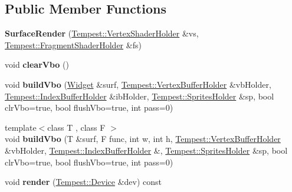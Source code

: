 \subsection*{Public Member Functions}
\begin{DoxyCompactItemize}
\item 
\hypertarget{class_tempest_1_1_surface_render_a8409eaaa4ee411aac49ae4cd9ac92573}{{\bfseries Surface\+Render} (\hyperlink{struct_tempest_1_1_vertex_shader_holder}{Tempest\+::\+Vertex\+Shader\+Holder} \&vs, \hyperlink{struct_tempest_1_1_fragment_shader_holder}{Tempest\+::\+Fragment\+Shader\+Holder} \&fs)}\label{class_tempest_1_1_surface_render_a8409eaaa4ee411aac49ae4cd9ac92573}

\item 
\hypertarget{class_tempest_1_1_surface_render_ae8529cbe1eae55aeda6684b8dc53145c}{void {\bfseries clear\+Vbo} ()}\label{class_tempest_1_1_surface_render_ae8529cbe1eae55aeda6684b8dc53145c}

\item 
\hypertarget{class_tempest_1_1_surface_render_ac4a3410c515efb6d6cb569a4bf5b7811}{void {\bfseries build\+Vbo} (\hyperlink{class_tempest_1_1_widget}{Widget} \&surf, \hyperlink{class_tempest_1_1_vertex_buffer_holder}{Tempest\+::\+Vertex\+Buffer\+Holder} \&vb\+Holder, \hyperlink{class_tempest_1_1_index_buffer_holder}{Tempest\+::\+Index\+Buffer\+Holder} \&ib\+Holder, \hyperlink{class_tempest_1_1_sprites_holder}{Tempest\+::\+Sprites\+Holder} \&sp, bool clr\+Vbo=true, bool flush\+Vbo=true, int pass=0)}\label{class_tempest_1_1_surface_render_ac4a3410c515efb6d6cb569a4bf5b7811}

\item 
\hypertarget{class_tempest_1_1_surface_render_ad46485e4217d02f5c46e112b7c929019}{{\footnotesize template$<$class T , class F $>$ }\\void {\bfseries build\+Vbo} (T \&surf, F func, int w, int h, \hyperlink{class_tempest_1_1_vertex_buffer_holder}{Tempest\+::\+Vertex\+Buffer\+Holder} \&vb\+Holder, \hyperlink{class_tempest_1_1_index_buffer_holder}{Tempest\+::\+Index\+Buffer\+Holder} \&, \hyperlink{class_tempest_1_1_sprites_holder}{Tempest\+::\+Sprites\+Holder} \&sp, bool clr\+Vbo=true, bool flush\+Vbo=true, int pass=0)}\label{class_tempest_1_1_surface_render_ad46485e4217d02f5c46e112b7c929019}

\item 
\hypertarget{class_tempest_1_1_surface_render_ab2e71efb217ef2a3049eeffe52d03a22}{void {\bfseries render} (\hyperlink{class_tempest_1_1_device}{Tempest\+::\+Device} \&dev) const }\label{class_tempest_1_1_surface_render_ab2e71efb217ef2a3049eeffe52d03a22}

\end{DoxyCompactItemize}
